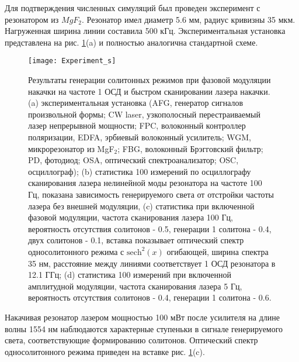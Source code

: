 
Для подтверждения численных симуляций был проведен эксперимент с резонатором из $MgF_2$. Резонатор имел диаметр 5.6 мм, радиус кривизны 35 мкм. Нагруженная ширина линии составила 500 кГц. Экспериментальная установка представлена на рис. \ref{chaos_order_experiment}(a) и полностью аналогична стандартной схеме.

\begin{figure}[ht]
\centering
  \texttt{[image: Experiment\_s]}
  \caption{Результаты генерации солитонных режимов при фазовой модуляции накачки на частоте 1 ОСД и быстром сканировании лазера накачки. (a) экспериментальная установка (AFG, генератор сигналов произвольной формы; CW laser, узкополосный перестраиваемый лазер непрерывной мощности; FPC, волоконный контроллер поляризации, EDFA, эрбиевый волоконный усилитель; WGM,  микрорезонатор из MgF$_2$; FBG, волоконный Брэгговский фильтр; PD, фотодиод; OSA, оптический спектроанализатор; OSC, осциллограф); (b) статистика 100 измерений по осциллографу сканирования лазера нелинейной моды резонатора на частоте 100 Гц, показана зависимость генерируемого света от отстройки частоты лазера без внешней модуляции, (c) статистика при включенной фазовой модуляции, частота сканирования лазера 100 Гц, вероятность отсутствия солитонов - 0.5, генерации 1 солитона - 0.4, двух солитонов - 0.1, вставка показывает оптический спектр односолитонного режима с $\text{sech}^2(x)$ огибающей, ширина спектра 35 нм, расстояние между линиями соответствует 1 ОСД резонатора в 12.1 ГГц; (d) статистика 100 измерений при включенной амплитудной модуляции, частота сканирования лазера 5 Гц, вероятность отсутствия солитонов - 0.4, генерации 1 солитона - 0.6.}
  \label{chaos_order_experiment}
\end{figure}

Накачивая резонатор лазером мощностью 100 мВт после усилителя на длине волны 1554 нм наблюдаются характерные ступеньки в сигнале генерируемого света, соответствующие формированию солитонов. Оптический спектр односолитонного режима приведен на вставке рис. \ref{chaos_order_experiment}(c).

